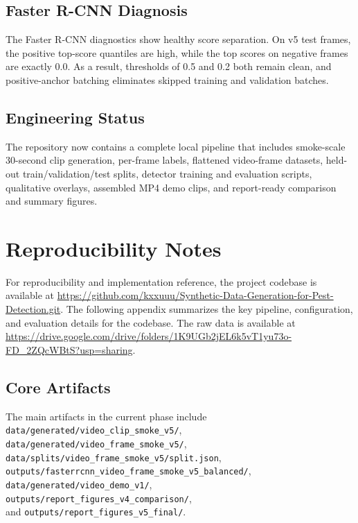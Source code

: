 \documentclass[11pt]{article}
\begin{document}
\subsection{Faster R-CNN Diagnosis}
The Faster R-CNN diagnostics show healthy score separation. On v5 test frames, the positive top-score quantiles are high, while the top scores on negative frames are exactly 0.0. As a result, thresholds of 0.5 and 0.2 both remain clean, and positive-anchor batching eliminates skipped training and validation batches.

\subsection{Engineering Status}
The repository now contains a complete local pipeline that includes smoke-scale 30-second clip generation, per-frame labels, flattened video-frame datasets, held-out train/validation/test splits, detector training and evaluation scripts, qualitative overlays, assembled MP4 demo clips, and report-ready comparison and summary figures.


\section{Reproducibility Notes}
For reproducibility and implementation reference, the project codebase is available at \url{https://github.com/kxxuuu/Synthetic-Data-Generation-for-Pest-Detection.git}. The following appendix summarizes the key pipeline, configuration, and evaluation details for the codebase. The raw data is available at \url{https://drive.google.com/drive/folders/1K9UGb2jEL6k5vT1yu73o-FD_2ZQcWBtS?usp=sharing}.
\subsection{Core Artifacts}
The main artifacts in the current phase include \texttt{data/generated/video\_clip\_smoke\_v5/},\\ \texttt{data/generated/video\_frame\_smoke\_v5/},\\ \texttt{data/splits/video\_frame\_smoke\_v5/split.json}, \\\texttt{outputs/fasterrcnn\_video\_frame\_smoke\_v5\_balanced/}, \\\texttt{data/generated/video\_demo\_v1/}, \\\texttt{outputs/report\_figures\_v4\_comparison/},\\ and \texttt{outputs/report\_figures\_v5\_final/}.
\end{document}
